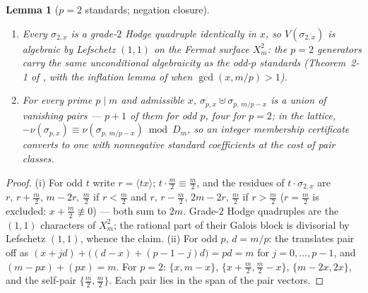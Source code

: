 \documentclass[11pt]{amsart}
\newtheorem{lemma}[theorem]{Lemma}
\theoremstyle{remark}
\newcommand{\fr}[1]{\langle #1\rangle}
\newcommand{\V}{V}
\begin{document}
\begin{lemma}[$p=2$ standards; negation closure]\label{lem:p2neg}
\begin{enumerate}
\item[(i)] Every $\sigma_{2,x}$ is a grade-$2$ Hodge quadruple identically in $x$, so
$\V(\sigma_{2,x})$ is algebraic by Lefschetz $(1,1)$ on the Fermat surface $X^2_m$: the $p=2$
generators carry the same unconditional algebraicity as the odd-$p$ standards (Theorem~2-1 of
\cite{Aoki87}, with the inflation lemma of \cite{BN} when $\gcd(x,m/p)>1$).
\item[(ii)] For every prime $p\mid m$ and admissible $x$, $\sigma_{p,x}\uplus\sigma_{p,\,m/p-x}$
is a union of vanishing pairs --- $p+1$ of them for odd $p$, four for $p=2$; in the lattice,
$-\nu(\sigma_{p,x})\equiv \nu(\sigma_{p,\,m/p-x})\bmod D_m$, so an integer membership certificate
converts to one with nonnegative standard coefficients at the cost of pair classes.
\end{enumerate}
\end{lemma}
\begin{proof}
(i) For odd $t$ write $r=\fr{tx}$; $t\cdot\frac m2\equiv\frac m2$, and the residues of
$t\cdot\sigma_{2,x}$ are $r,\,r+\frac m2,\,m-2r,\,\frac m2$ if $r<\frac m2$ and
$r,\,r-\frac m2,\,2m-2r,\,\frac m2$ if $r>\frac m2$ ($r=\frac m2$ is excluded: $x+\frac m2
\not\equiv0$) --- both sum to $2m$. Grade-$2$ Hodge quadruples are the $(1,1)$ characters of
$X^2_m$; the rational part of their Galois block is divisorial by Lefschetz $(1,1)$, whence the
claim. (ii) For odd $p$, $d=m/p$: the translates pair off as
$(x+jd)+\bigl((d-x)+(p-1-j)d\bigr)=pd=m$ for $j=0,\dots,p-1$, and $(m-px)+(px)=m$. For $p=2$:
$\{x,m-x\}$, $\{x+\frac m2,\frac m2-x\}$, $\{m-2x,2x\}$, and the self-pair
$\{\frac m2,\frac m2\}$. Each pair lies in the span of the pair vectors.
\end{proof}
\end{document}
